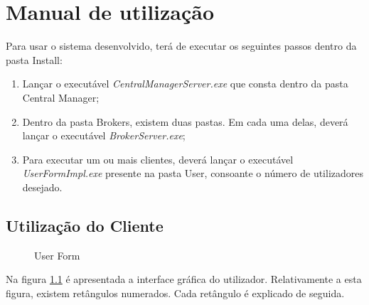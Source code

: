 \chapter{Manual de utilização} \label{manual}

Para usar o sistema desenvolvido, terá de executar os seguintes passos dentro da pasta Install:

\begin{enumerate}
	\item Lançar o executável \textit{CentralManagerServer.exe} que consta dentro da pasta Central Manager;
	\item Dentro da pasta Brokers, existem duas pastas. Em cada uma delas, deverá lançar o executável \textit{BrokerServer.exe};
	\item Para executar um ou mais clientes, deverá lançar o executável \textit{UserFormImpl.exe} presente na pasta User, consoante o número de utilizadores desejado.
\end{enumerate}

\section{Utilização do Cliente}

\begin{figure}[h]
	\caption{User Form}
	\label{form}
\end{figure}

Na figura \ref{form} é apresentada a interface gráfica do utilizador.
Relativamente a esta figura, existem retângulos numerados. Cada retângulo é explicado de seguida.\\

